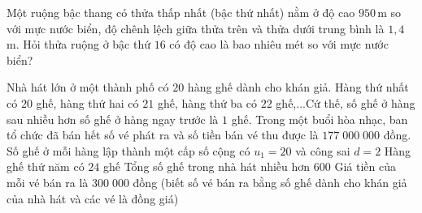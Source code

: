 \begin{bt}%
Một ruộng bậc thang có thửa thấp nhất (bậc thứ nhất) nằm ở độ cao $950$\,m so với mực nước biển, độ chênh lệch giữa thửa trên và thửa dưới trung bình là $1{,}4$\,m. Hỏi thửa ruộng ở bậc thứ $16$ có độ cao là bao nhiêu mét so với mực nước biển?
\end{bt}

\begin{ex}%
Nhà hát lớn ở một thành phố có $20$ hàng ghế dành cho khán giả. Hàng thứ nhất có $20$ ghế, hàng thứ hai có $21$ ghế, hàng thứ ba có $22$ ghế,...Cứ thế, số ghế ở hàng sau nhiều hơn số ghế ở hàng ngay trước là $1$ ghế. Trong một buổi hòa nhạc, ban tổ chức đã bán hết số vé phát ra và số tiền bán vé thu được là $177\;000\;000$ đồng.
	\choiceTF
	{Số ghế ở mỗi hàng lập thành một cấp số cộng có $u_1=20$ và công sai $d=2$}
	{\True Hàng ghế thứ năm có $24$ ghế}
	{Tổng số ghế trong nhà hát nhiều hơn $600$}
	{\True Giá tiền của mỗi vé bán ra là $300\;000$ đồng (biết số vé bán ra bằng số ghế dành cho khán giả của nhà hát và các vé là đồng giá)}
\end{ex}

